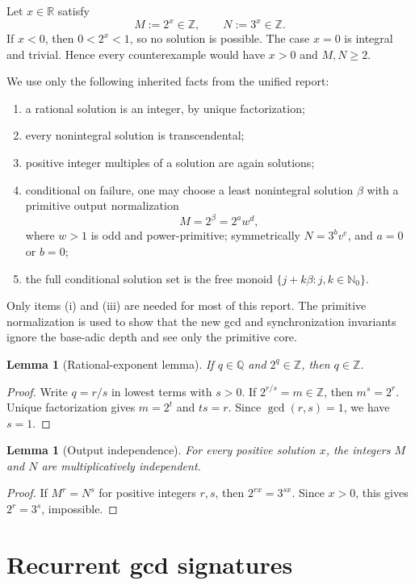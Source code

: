 \documentclass[11pt,oneside]{article}
\newtheorem{lemma}[theorem]{Lemma}
\theoremstyle{definition}
\theoremstyle{remark}
\newcommand{\Nzero}{\mathbb N_0}
\newcommand{\Z}{\mathbb Z}
\newcommand{\Q}{\mathbb Q}
\newcommand{\R}{\mathbb R}
\begin{document}
Let $x\in\R$ satisfy
\[
 M:=2^x\in\Z,\qquad N:=3^x\in\Z.
\]
If $x<0$, then $0<2^x<1$, so no solution is possible.  The case $x=0$ is integral and
trivial.  Hence every counterexample would have $x>0$ and $M,N\ge2$.

We use only the following inherited facts from the unified report:
\begin{enumerate}[label=\textup{(\roman*)}]
\item a rational solution is an integer, by unique factorization;
\item every nonintegral solution is transcendental;
\item positive integer multiples of a solution are again solutions;
\item conditional on failure, one may choose a least nonintegral solution $\beta$ with a
primitive output normalization
\[
  M=2^\beta=2^a w^d,
\]
where $w>1$ is odd and power-primitive; symmetrically
$N=3^b v^e$, and $a=0$ or $b=0$;
\item the full conditional solution set is the free monoid
$\{j+k\beta:j,k\in\Nzero\}$.
\end{enumerate}

Only items (i) and (iii) are needed for most of this report.  The primitive normalization is
used to show that the new gcd and synchronization invariants ignore the base-adic depth and
see only the primitive core.

\begin{lemma}[Rational-exponent lemma]
\label{lem:rational}
If $q\in\Q$ and $2^q\in\Z$, then $q\in\Z$.
\end{lemma}

\begin{proof}
Write $q=r/s$ in lowest terms with $s>0$.  If $2^{r/s}=m\in\Z$, then
$m^s=2^r$.  Unique factorization gives $m=2^t$ and $ts=r$.  Since
$\gcd(r,s)=1$, we have $s=1$.
\end{proof}

\begin{lemma}[Output independence]
\label{lem:MNindependent}
For every positive solution $x$, the integers $M$ and $N$ are multiplicatively independent.
\end{lemma}

\begin{proof}
If $M^r=N^s$ for positive integers $r,s$, then
$2^{rx}=3^{sx}$.  Since $x>0$, this gives $2^r=3^s$, impossible.
\end{proof}

\section{Recurrent gcd signatures}
\label{sec:recurrence}
\end{document}
